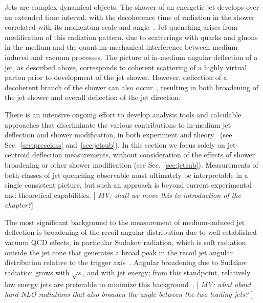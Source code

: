 Jets are complex dynamical objects. The shower of an energetic jet develops over an extended time interval, with the decoherence time of radiation in the shower correlated with its momentum scale and angle~\cite{Andrews:2018jcm}. Jet quenching arises from modification of this radiation pattern, due to scatterings with quarks and gluons in the medium and the quantum-mechanical interference between medium-induced and vacuum processes. The picture of in-medium angular deflection of a jet, as described above, corresponds to coherent scattering of a highly virtual parton prior to development of the jet shower. However, deflection of a decoherent branch of the shower can also occur~\cite{DEramo:2018eoy}, resulting in both broadening of the jet shower and overall deflection of the jet direction. 

There is an intensive ongoing effort to develop analysis tools and calculable approaches that discriminate the various contributions to in-medium jet deflection and shower modification, in both experiment and theory~\cite{Andrews:2018jcm} (see Sec.~\ref{sec:preceloss} and~\ref{sec:jetsub}). In this section we focus solely on jet-centroid deflection measurements, without consideration of the effects of shower broadening or other shower modification (see Sec.~\ref{sec:jetsub}). Measurements of both classes of jet quenching observable must ultimately be interpretable in a single consistent picture, but such an approach is beyond current experimental and theoretical capabilities. [{\it \color{blue} MV: shall we move this to introduction of the chapter?\color{black}}]

The most significant background to the measurement of medium-induced jet deflection is broadening of the recoil angular distribution due to well-established vacuum QCD effects, in particular Sudakov radiation, which is soft radiation outside the jet cone that generates a broad peak in the recoil jet angular distribution relative to the trigger axis~\cite{Chen:2016vem,Mueller:2016xoc}. Angular broadening due to Sudakov radiation grows with $\sqrt{s}$, and with jet energy; from this standpoint, relatively low energy jets are preferable to minimize this background~\cite{Chen:2016vem}.
[{\it \color{blue} MV: what about hard NLO radiations that also broaden the angle between the two leading jets?\color{black} }]

